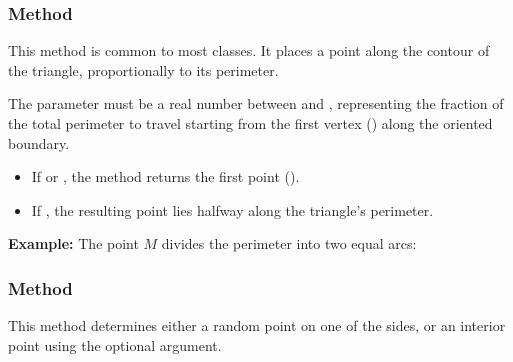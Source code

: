 \subsubsection{Method } %
\label{ssub:method_triangle_point_r}

This method is common to most classes. It places a point along the contour of the triangle, proportionally to its perimeter.

\medskip
\noindent
The parameter  must be a real number between  and , representing the fraction of the total perimeter to travel starting from the first vertex () along the oriented boundary.

\begin{itemize}
  \item If  or , the method returns the first point ().
  \item If , the resulting point lies halfway along the triangle’s perimeter.
\end{itemize}

\medskip
\noindent
\textbf{Example:} The point $M$ divides the perimeter into two equal arcs:
\begin{center}
\end{center}

\vspace{1em}


\begin{tkzexample}[latex=.5\textwidth]
\end{tkzexample}


\subsubsection{Method } %
\label{ssub:method_triangle_random_inside}

This method determines either a random point on one of the sides, or an interior point using the optional  argument.

